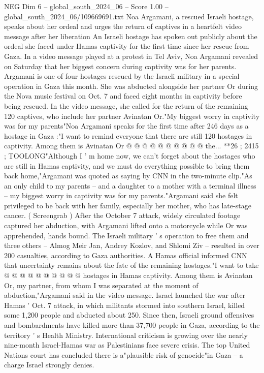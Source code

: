 \begin{textsample}{NEG Dim 6 – global\_south\_2024\_06 – Score 1.00 – global\_south\_2024\_06/109669691.txt}  \label{ex:f6_neg_304}
Noa Argamani, a rescued Israeli hostage, speaks about her ordeal and urges the return of captives in a heartfelt video message after her liberation An Israeli hostage has spoken out publicly about the ordeal she faced under Hamas captivity for the first time since her rescue from Gaza.
In a video message played at a protest in Tel Aviv, Noa Argamani revealed on Saturday that her biggest concern during captivity was for her parents.
Argamani is one of four hostages rescued by the Israeli military in a special operation in Gaza this month.
She was abducted alongside her partner Or during the Nova music festival on Oct. 7 and faced eight months in captivity before being rescued.
In the video message, she called for the return of the remaining 120 captives, who include her partner Avinatan Or."My biggest worry in captivity was for my parents"Noa Argamani speaks for the first time after 246 days as a hostage in Gaza :"I want to remind everyone that there are still 120 hostages in captivity.
Among them is Avinatan Or @ @ @ @ @ @ @ @ @ @ the... **26 ; 2415 ; TOOLONG"Although I ' m home now, we can't forget about the hostages who are still in Hamas captivity, and we must do everything possible to bring them back home,"Argamani was quoted as saying by CNN in the two-minute clip."As an only child to my parents -- and a daughter to a mother with a terminal illness -- my biggest worry in captivity was for my parents."Argamani said she felt privileged to be back with her family, especially her mother, who has late-stage cancer. ( Screengrab ) After the October 7 attack, widely circulated footage captured her abduction, with Argamani lifted onto a motorcycle while Or was apprehended, hands bound.
The Israeli military ' s operation to free them and three others -- Almog Meir Jan, Andrey Kozlov, and Shlomi Ziv -- resulted in over 200 casualties, according to Gaza authorities.
A Hamas official informed CNN that uncertainty remains about the fate of the remaining hostages."I want to take @ @ @ @ @ @ @ @ @ @ hostages in Hamas captivity.
Among them is Avinatan Or, my partner, from whom I was separated at the moment of abduction,"Argamani said in the video message.
Israel launched the war after Hamas ' Oct. 7 attack, in which militants stormed into southern Israel, killed some 1,200 people and abducted about 250.
Since then, Israeli ground offensives and bombardments have killed more than 37,700 people in Gaza, according to the territory ' s Health Ministry.
International criticism is growing over the nearly nine-month Israel-Hamas war as Palestinians face severe crisis.
The top United Nations court has concluded there is a"plausible risk of genocide"in Gaza -- a charge Israel strongly denies.

\end{textsample}
